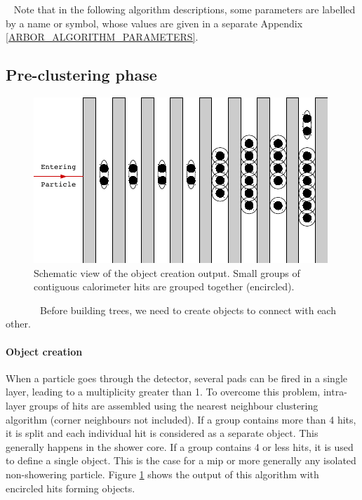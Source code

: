\documentclass[cits]{JINST}
\begin{document}
~\newline 
Note that in the following algorithm descriptions, some parameters are labelled by a name or symbol, whose values are given in a separate Appendix \ref{ARBOR_ALGORITHM_PARAMETERS}.

\subsection*{Pre-clustering phase} 

\begin{figure}
  \vspace{-20pt}
  \begin{center}
    \includegraphics[width=\linewidth]{ObjectCreationAfter.pdf}
  \end{center}
  \vspace{-10pt}
  \caption{\label{ARBOR_OBJECT_CREATION} Schematic view of the object creation output. Small groups of contiguous calorimeter hits are grouped together (encircled).}
  \vspace{-20pt}
\end{figure}

~~~~~~~Before building trees, we need to create objects to connect with each other.

\paragraph*{Object creation} When a particle goes through the detector, several pads can be fired in a single layer, leading to a multiplicity greater than 1. To overcome this problem, intra-layer groups of hits are assembled using the nearest neighbour clustering algorithm (corner neighbours not included). If a group contains more than 4 hits, it is split and each individual hit is considered as a separate object. This generally happens in the shower core. If a group contains 4 or less hits, it is used to define a single object. This is the case for a mip or more generally any isolated non-showering particle. Figure \ref{ARBOR_OBJECT_CREATION} shows the output of this algorithm with encircled hits forming objects.
\end{document}
